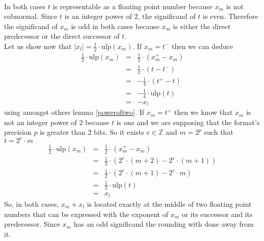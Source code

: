 \documentclass[a4paper,10pt,twoside]{article}
\newenvironment{proof}[1][Proof]{\begin{trivlist}
\item[\hskip \labelsep {\bfseries #1}]}{\end{trivlist}}
\newcommand{\qed}{\nobreak \ifvmode \relax \else \ifdim \lastskip<1.5em \hskip-\lastskip
\hskip1.5em plus0em minus0.5em \fi \nobreak \vrule height0.75em width0.5em depth0.25em\fi}
\newcommand{\Z}{\ensuremath{\mathbb {Z}}}
\newcommand{\mi}{\ensuremath{\mathit{m}}}
\newcommand{\lo}{\ensuremath{\mathit{l}}}
\newcommand{\mUlp}{\ensuremath{\mathrm{ulp}}}
\begin{document}
\begin{proof} ~\\
In both cases $t$ is representable as a floating point number because $x_\mi$ is not subnormal.
Since $t$ is an integer power of $2$, the significand of $t$ is even. 
Therefore the significand of $x_\mi$ is odd in both cases because $x_\mi$ is either the direct predecessor or the direct
successor of $t$. \\
Let us show now that $\left \vert x_\lo \right \vert = \frac{1}{2} \cdot \mUlp\left(x_\mi \right)$.
If $x_\mi = t^-$ then we can deduce
\begin{eqnarray*}
\frac{1}{2} \cdot \mUlp\left( x_\mi \right) & = & \frac{1}{2} \cdot \left( x_\mi^+ - x_\mi \right) \\
& = & \frac{1}{2} \cdot \left( t - t^- \right) \\
& = & - \frac{1}{4} \cdot \left( t^+ - t \right) \\
& = & - \frac{1}{4} \cdot \mUlp\left( t \right) \\
& = & - x_\lo
\end{eqnarray*}
using amongst others lemma \ref{poweroftwo}. 
If $x_\mi = t^+$ then we know that $x_\mi$ is not an integer power of $2$ because $t$ is one and we are supposing that the 
format's precision $p$ is greater than $2$ bits. So it exists $e \in \Z$ and $m = 2^p$ such that $t = 2^e \cdot m$
\begin{eqnarray*}
\frac{1}{2} \cdot \mUlp\left( x_\mi \right) & = & \frac{1}{2} \cdot \left( x_\mi^+ - x_\mi \right) \\
& = & \frac{1}{2} \cdot \left( 2^e \cdot \left( m + 2 \right) - 2^e \cdot \left( m + 1 \right) \right) \\
& = & \frac{1}{2} \cdot \left( 2^e \cdot \left( m + 1 \right) - 2^e \cdot m \right) \\
& = & \frac{1}{2} \cdot \mUlp\left( t \right) \\
& = & x_\lo
\end{eqnarray*}
So, in both cases, $x_\mi + x_\lo$ is located exactly at the middle of two floating point numbers that can be expressed 
with the exponent of $x_\mi$ or its successor and its predecessor.
Since $x_\mi$ has an odd significand the rounding with done away from it.\qed
\end{proof}
\end{document}
